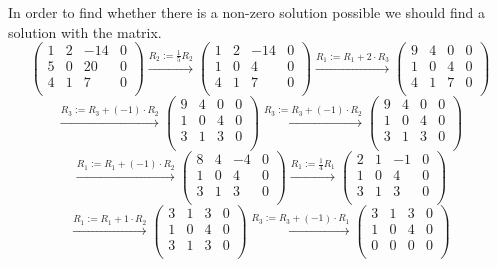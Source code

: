 \documentclass[a4paper]{article}
\begin{document}
In order to find whether there is a non-zero solution possible we should find a solution with the matrix.
\[
\left(
\begin{array}{ccc|c}
1 & 2 & -14 & 0 \\
5 & 0 & 20 & 0 \\
4 & 1 & 7 & 0 \\
\end{array}
\right)
\xrightarrow{\text{$R_2 := \frac{1}{5} R_2$}}
\left(
\begin{array}{ccc|c}
1 & 2 & -14 & 0 \\
1 & 0 & 4 & 0 \\
4 & 1 & 7 & 0 \\
\end{array}
\right)
\xrightarrow{\text{$R_1 := R_1 + 2 \cdot R_3$}}
\left(
\begin{array}{ccc|c}
9 & 4 & 0 & 0 \\
1 & 0 & 4 & 0 \\
4 & 1 & 7 & 0 \\
\end{array}
\right)
\]
\[
\xrightarrow{\text{$R_3 := R_3 + (-1) \cdot R_2$}}
\left(
\begin{array}{ccc|c}
9 & 4 & 0 & 0 \\
1 & 0 & 4 & 0 \\
3 & 1 & 3 & 0 \\
\end{array}
\right)
\xrightarrow{\text{$R_3 := R_3 + (-1) \cdot R_2$}}
\left(
\begin{array}{ccc|c}
9 & 4 & 0 & 0 \\
1 & 0 & 4 & 0 \\
3 & 1 & 3 & 0 \\
\end{array}
\right)
\]
\[
\xrightarrow{\text{$R_1 := R_1 + (-1) \cdot R_2$}}
\left(
\begin{array}{ccc|c}
8 & 4 & -4 & 0 \\
1 & 0 & 4 & 0 \\
3 & 1 & 3 & 0 \\
\end{array}
\right)
\xrightarrow{\text{$R_1 := \frac{1}{4} R_1$}}
\left(
\begin{array}{ccc|c}
2 & 1 & -1 & 0 \\
1 & 0 & 4 & 0 \\
3 & 1 & 3 & 0 \\
\end{array}
\right)
\]
\[
\xrightarrow{\text{$R_1 := R_1 + 1 \cdot R_2$}}
\left(
\begin{array}{ccc|c}
3 & 1 & 3 & 0 \\
1 & 0 & 4 & 0 \\
3 & 1 & 3 & 0 \\
\end{array}
\right)
\xrightarrow{\text{$R_3 := R_3 + (-1) \cdot R_1$}}
\left(
\begin{array}{ccc|c}
3 & 1 & 3 & 0 \\
1 & 0 & 4 & 0 \\
0 & 0 & 0 & 0 \\
\end{array}
\right)
\]
\end{document}

